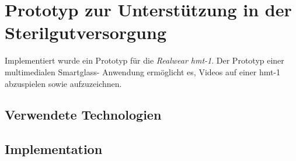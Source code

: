 \chapter{Prototyp zur Unterstützung in der Sterilgutversorgung}
Implementiert wurde ein Prototyp für die \emph{Realwear hmt-1}. Der Prototyp einer multimedialen Smartglass- Anwendung ermöglicht es, Videos auf einer hmt-1 abzuspielen sowie aufzuzeichnen. 
%
%
\section{Verwendete Technologien}
%
%
\section{Implementation}
